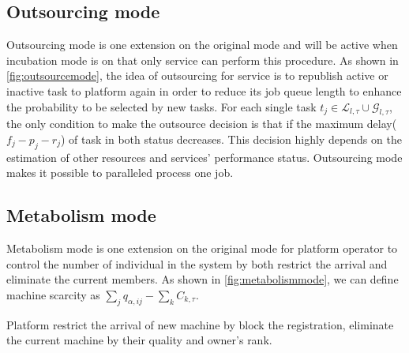 \subsection{Outsourcing mode} %
\label{sub:outsource_mode}
Outsourcing mode is one extension on the original mode and will be active when incubation mode is on that only service can perform this procedure. As shown in \autoref{fig:outsourcemode},
the idea of outsourcing for service is to republish active or inactive task to platform again in order to reduce its job queue length to enhance the probability to be selected by new tasks. For each single task $t_j\in\mathcal{L}_{l,\tau}\cup\mathcal{G}_{l,\tau}$, the only condition to make the outsource decision is that if the maximum delay($f_j-p_j-r_j$) of task in both status decreases. This decision highly depends on the estimation of other resources and services' performance status. Outsourcing mode makes it possible to paralleled process one job.

\subsection{Metabolism mode} %
\label{sub:metabolism mode}
Metabolism mode is one extension on the original mode for platform operator to control the number of individual in the system by both restrict the arrival and eliminate the current members. As shown in \autoref{fig:metabolismmode},
we can define machine scarcity as $\sum_jq_{\alpha,ij} - \sum_kC_{k,\tau}$.

Platform restrict the arrival of new machine by block the registration, eliminate the current machine by their quality and owner's rank.


